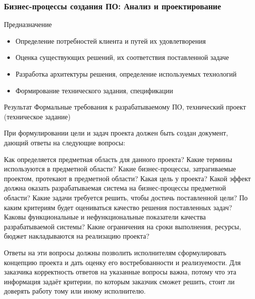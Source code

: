 \documentclass{../industrial-development}
\begin{document}
\begin{frame} \frametitle{Бизнес-процессы создания ПО: Анализ и проектирование}
	\begin{block}{Предназначение}
		\begin{itemize}
			\item Определение потребностей клиента и путей их удовлетворения
			\item Оценка существующих решений, их соответствия поставленной задаче
			\item Разработка архитектуры решения, определение используемых технологий
			\item Формирование технического задания, спецификации
		\end{itemize}
	\end{block}
	\begin{block}{Результат}
		Формальные требования к разрабатываемому ПО, технический проект (техническое задание)
	\end{block}
\end{frame}
\lecturenotes

При формулировании цели и задач проекта должен быть создан документ, дающий ответы на следующие вопросы:

Как определяется предметная область для данного проекта? Какие термины используются в предметной области? Какие бизнес-процессы, затрагиваемые проектом, протекают в предметной области?
Какая цель у проекта? Какой эффект должна оказать разрабатываемая система на бизнес-процессы предметной области?
Какие задачи требуется решить, чтобы достичь поставленной цели? По каким критериям будет оцениваться качество решения поставленных задач? Каковы функциональные и нефункциональные показатели качества разрабатываемой системы?
Какие ограничения на сроки выполнения, ресурсы, бюджет накладываются на реализацию проекта?



Ответы на эти вопросы должны позволить исполнителям сформулировать концепцию проекта и дать оценку его востребованности и реализуемости. Для заказчика корректность ответов на указанные вопросы важна, потому что эта информация задаёт критерии, по которым заказчик сможет решить, стоит ли доверять работу тому или иному исполнителю.
\end{document}
